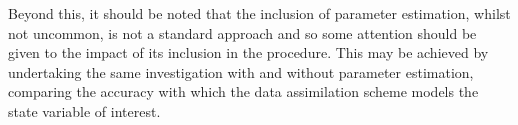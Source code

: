 Beyond this, it should be noted that the inclusion of parameter estimation,
whilst not uncommon, is not a standard approach and so some attention should be
given to the impact of its inclusion in the procedure.
This may be achieved by undertaking the same investigation with and without
parameter estimation, comparing the accuracy with which the data assimilation
scheme models the state variable of interest.





